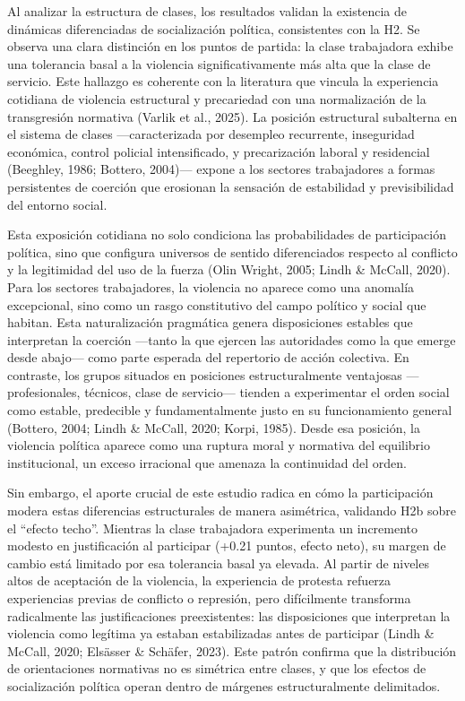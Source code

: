 \documentclass[
  13pt,
]{article}
\begin{document}
Al analizar la estructura de clases, los resultados validan la
existencia de dinámicas diferenciadas de socialización política,
consistentes con la H2. Se observa una clara distinción en los puntos de
partida: la clase trabajadora exhibe una tolerancia basal a la violencia
significativamente más alta que la clase de servicio. Este hallazgo es
coherente con la literatura que vincula la experiencia cotidiana de
violencia estructural y precariedad con una normalización de la
transgresión normativa (Varlik et al., 2025). La posición estructural
subalterna en el sistema de clases ---caracterizada por desempleo
recurrente, inseguridad económica, control policial intensificado, y
precarización laboral y residencial (Beeghley, 1986; Bottero, 2004)---
expone a los sectores trabajadores a formas persistentes de coerción que
erosionan la sensación de estabilidad y previsibilidad del entorno
social.

Esta exposición cotidiana no solo condiciona las probabilidades de
participación política, sino que configura universos de sentido
diferenciados respecto al conflicto y la legitimidad del uso de la
fuerza (Olin Wright, 2005; Lindh \& McCall, 2020). Para los sectores
trabajadores, la violencia no aparece como una anomalía excepcional,
sino como un rasgo constitutivo del campo político y social que habitan.
Esta naturalización pragmática genera disposiciones estables que
interpretan la coerción ---tanto la que ejercen las autoridades como la
que emerge desde abajo--- como parte esperada del repertorio de acción
colectiva. En contraste, los grupos situados en posiciones
estructuralmente ventajosas ---profesionales, técnicos, clase de
servicio--- tienden a experimentar el orden social como estable,
predecible y fundamentalmente justo en su funcionamiento general
(Bottero, 2004; Lindh \& McCall, 2020; Korpi, 1985). Desde esa posición,
la violencia política aparece como una ruptura moral y normativa del
equilibrio institucional, un exceso irracional que amenaza la
continuidad del orden.

Sin embargo, el aporte crucial de este estudio radica en cómo la
participación modera estas diferencias estructurales de manera
asimétrica, validando H2b sobre el ``efecto techo''. Mientras la clase
trabajadora experimenta un incremento modesto en justificación al
participar (+0.21 puntos, efecto neto), su margen de cambio está
limitado por esa tolerancia basal ya elevada. Al partir de niveles altos
de aceptación de la violencia, la experiencia de protesta refuerza
experiencias previas de conflicto o represión, pero difícilmente
transforma radicalmente las justificaciones preexistentes: las
disposiciones que interpretan la violencia como legítima ya estaban
estabilizadas antes de participar (Lindh \& McCall, 2020; Elsässer \&
Schäfer, 2023). Este patrón confirma que la distribución de
orientaciones normativas no es simétrica entre clases, y que los efectos
de socialización política operan dentro de márgenes estructuralmente
delimitados.
\end{document}
